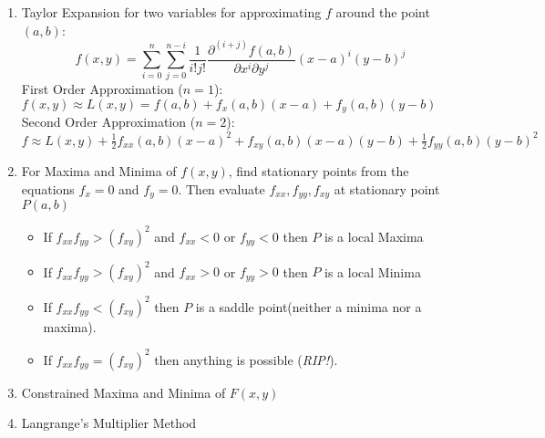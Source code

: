 \documentclass{article}
\begin{document}
\begin{enumerate}
    \item Taylor Expansion for two variables for approximating $f$ around the point $(a,b)$:
    $$f(x,y)=\sum_{i=0}^n\sum_{j=0}^{n-i}\frac{1}{i!j!}\frac{\partial^{(i+j)}f(a,b)}{\partial x^i \partial y^j}(x-a)^i(y-b)^j$$
    First Order Approximation ($n=1$):$f(x,y)\approx L(x,y)= f(a,b)+f_x(a,b)(x-a)+f_y(a,b)(y-b)$
    \\Second Order Approximation ($n=2$):$f \approx L(x,y)+\frac{1}{2}f_{xx}(a,b)(x-a)^2+f_{xy}(a,b)(x-a)(y-b)+\frac{1}{2}f_{yy}(a,b)(y-b)^2$
    \item For Maxima and Minima of $f(x,y)$, find stationary points from the equations $f_x=0$ and $f_y=0$. 
    Then evaluate $f_{xx},f_{yy},f_{xy}$ at stationary point $P(a,b)$
    \begin{itemize}
        \item If $f_{xx}f_{yy}>(f_{xy})^2$ and $f_{xx}<0$ or $f_{yy}<0$ then $P$ is a local Maxima
        \item If $f_{xx}f_{yy}>(f_{xy})^2$ and $f_{xx}>0$ or $f_{yy}>0$ then $P$ is a local Minima
        \item If $f_{xx}f_{yy}<(f_{xy})^2$ then $P$ is a saddle point(neither a minima nor a maxima). 
        \item If $f_{xx}f_{yy}=(f_{xy})^2$ then anything is possible (\textit{RIP!}).
    \end{itemize}
    \item Constrained Maxima and Minima of $F(x,y)$
    \item Langrange's Multiplier Method
    
\end{enumerate}

    
\end{document}

